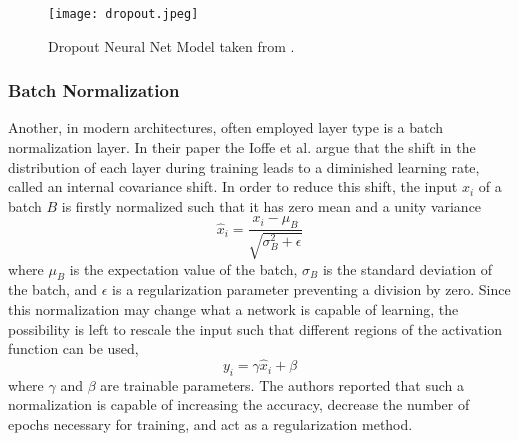 \begin{figure}[H]
	\centering
	\texttt{[image: dropout.jpeg]}
	 \caption{Dropout Neural Net Model taken from \cite{DropoutOriginal}.}
 \label{DropoutDiagram}
\end{figure}



\subsubsection{Batch Normalization}

Another, in modern architectures, often employed layer type is a batch normalization layer. In their paper \cite{Ioffe2015} the Ioffe et al. argue that the shift in the distribution of each layer during training leads to a diminished learning rate, called an internal covariance shift. In order to reduce this shift, the input $x_i$ of a batch $B$ is firstly normalized such that it has zero mean and a unity variance
\begin{equation}
\hat{x}_i = \frac{x_i-\mu_B}{\sqrt{\sigma_B^2+\epsilon}}
\end{equation}
where $\mu_B$ is the expectation value of the batch, $\sigma_B$ is the standard deviation of the batch, and $\epsilon$ is a regularization parameter preventing a division by zero. Since this normalization may change what a network is capable of learning, the possibility is left to rescale the input such that different regions of the activation function can be used,
\begin{equation}
y_i = \gamma \hat{x}_i + \beta
\end{equation}
where $\gamma$ and $\beta$ are trainable parameters. The authors reported that such a normalization is capable of increasing the accuracy, decrease the number of epochs necessary for training, and act as a regularization method.

